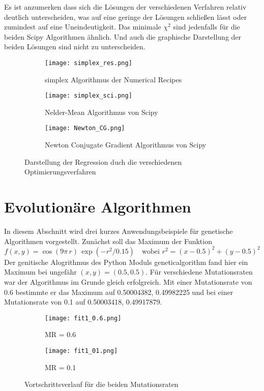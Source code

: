 \documentclass[12pt]{article}
\begin{document}
Es ist anzumerken dass sich die Lösungen der verschiedenen Verfahren relativ deutlich unterscheiden, was auf eine geringe der Lösungen schließen lässt oder zumindest auf eine Uneindeutigkeit. Das minimale $\chi^2$ sind jedenfalls für die beiden Scipy Algorithmen ähnlich. Und auch die graphische Darstellung der beiden Lösungen sind nicht zu unterscheiden.

\begin{figure}[H]\hspace*{-1.5cm}
    \begin{subfigure}{0.4\textwidth}
    \texttt{[image: simplex\_res.png]}
    \caption{simplex Algorithmus der Numerical Recipes}
    \end{subfigure}
    \hfill
    \begin{subfigure}{0.4\textwidth}
    \hspace*{0.8cm}
    \texttt{[image: simplex\_sci.png]}
    \caption{Nelder-Mean Algorithmus von Scipy}
    \end{subfigure}
    \hfill
    \hspace*{-1.5cm}
    \begin{subfigure}{0.4\textwidth}
    \texttt{[image: Newton\_CG.png]}
    \caption{Newton Conjugate Gradient Algorithmus von Scipy}
    \end{subfigure}
    \hfill
    \caption{Darstellung der Regression duch die verschiedenen Optimierungsverfahren}
\end{figure}

\section{Evolutionäre Algorithmen}
In diesem Abschnitt wird drei kurzes Anwendungsbeispiele für genetische Algorithmen vorgestellt. Zunächst soll das Maximum der Funktion 
$$f(x,y)=\cos(9\pi\,r)\,\exp(-r^2/0.15)\quad\text{wobei }r^2=(x-0.5)^2+(y-0.5)^2$$
Der genitische Alogrithmus des Python Moduls geneticalgorithm fand hier ein Maximum bei ungefähr $(x,y)=(0.5,0.5)$. Für verschiedene Mutationsraten war der Algorithmus im Grunde gleich erfolgreich.\newline\newline
Mit einer Mutationsrate von 0.6 bestimmte er das Maximum auf 0.50004382, 0.49982225 und bei einer Mutationsrate von 0.1 auf 0.50003418, 0.49917879.
\begin{figure}[H]\hspace*{-1.7cm}
    \begin{subfigure}{0.4\textwidth}
    \texttt{[image: fit1\_0.6.png]}
    \caption{MR = 0.6}
    \end{subfigure}
    \hfill
    \begin{subfigure}{0.4\textwidth}
    \hspace*{-0.8cm}
    \texttt{[image: fit1\_01.png]}
    \caption{MR = 0.1}
    \end{subfigure}
    \hfill
    \caption{Vortschrittsverlauf für die beiden Mutationsraten}
\end{figure}
\end{document}
